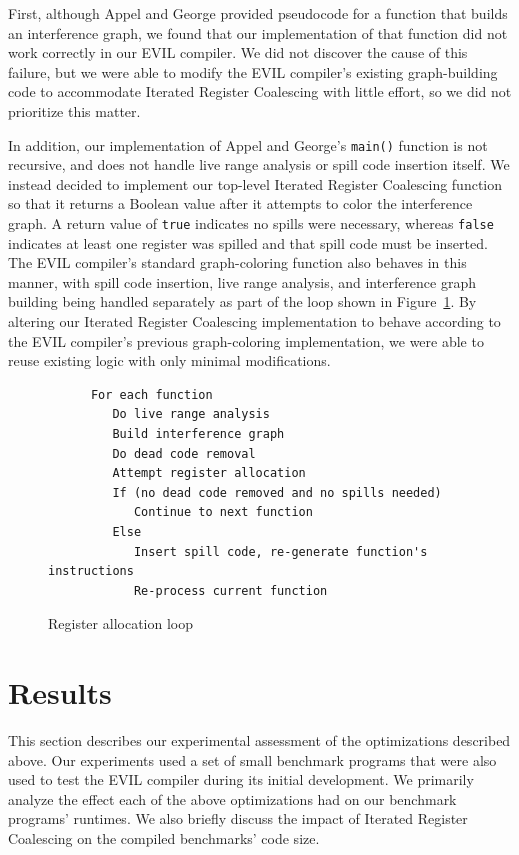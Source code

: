 \documentclass[12pt]{article}
\begin{document}
First, although Appel and George provided pseudocode for a function that builds an interference graph, we found that our implementation of that function did not work correctly in our EVIL compiler.
We did not discover the cause of this failure, but we were able to modify the EVIL compiler's existing graph-building code to accommodate Iterated Register Coalescing with little effort, so we did not prioritize this matter.

In addition, our implementation of Appel and George's {\tt main()} function is not recursive, and does not handle live range analysis or spill code insertion itself.
We instead decided to implement our top-level Iterated Register Coalescing function so that it returns a Boolean value after it attempts to color the interference graph.
A return value of {\tt true} indicates no spills were necessary, whereas {\tt false} indicates at least one register was spilled and that spill code must be inserted.
The EVIL compiler's standard graph-coloring function also behaves in this manner, with spill code insertion, live range analysis, and interference graph building being handled separately as part of the loop shown in Figure~\ref{fig:ircLoop}.
By altering our Iterated Register Coalescing implementation to behave according to the EVIL compiler's previous graph-coloring implementation, we were able to reuse existing logic with only minimal modifications.

\begin{figure}
\begin{verbatim}
      For each function
         Do live range analysis
         Build interference graph
         Do dead code removal
         Attempt register allocation
         If (no dead code removed and no spills needed)
            Continue to next function
         Else
            Insert spill code, re-generate function's instructions
            Re-process current function
\end{verbatim}
\caption{Register allocation loop}
\label{fig:ircLoop}
\end{figure}

\section{Results}
This section describes our experimental assessment of the optimizations described above.
Our experiments used a set of small benchmark programs that were also used to test the EVIL compiler during its initial development.
We primarily analyze the effect each of the above optimizations had on our benchmark programs' runtimes.
We also briefly discuss the impact of Iterated Register Coalescing on the compiled benchmarks' code size.
\end{document}
